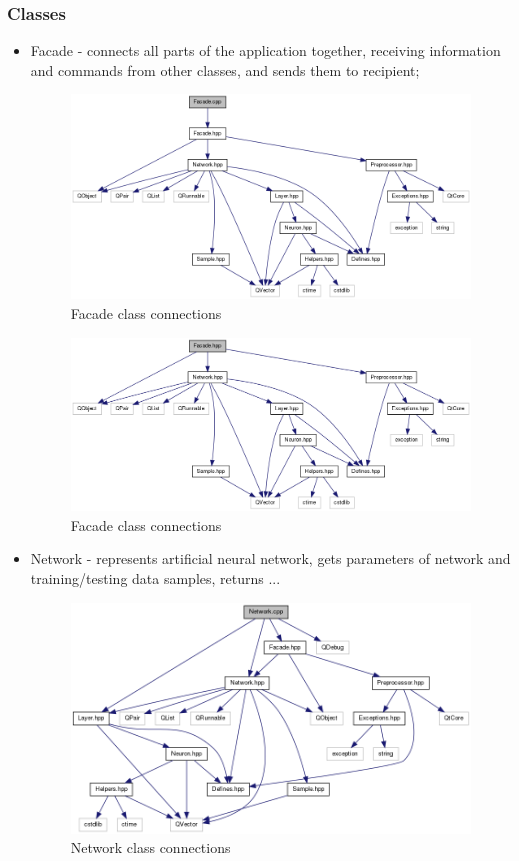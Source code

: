 \documentclass[a4paper,12pt]{article}
\begin{document}
\subsubsection{Classes}
\begin{itemize}
 \item Facade - connects all parts of the application together, receiving information and commands from other classes, and sends them to recipient;
 \begin{figure}[ht]
 \centering
 \includegraphics[scale=0.4]{images/facadecppincl.png}
 \caption{Facade class connections}
\end{figure}

 \begin{figure}[ht]
 \centering
 \includegraphics[scale=0.4]{images/facadehppincl.png}
 \caption{Facade class connections}
\end{figure}

\item Network - represents artificial neural network, gets parameters of network and training/testing data samples, returns ...

 \begin{figure}[ht]
 \centering
 \includegraphics[scale=0.5]{images/networkcppincl.png}
 \caption{Network class connections}
\end{figure}


\end{itemize}
\end{document}
